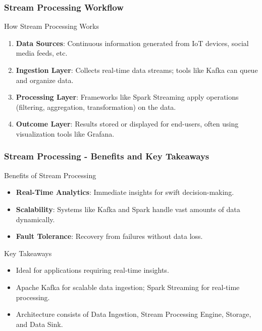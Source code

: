 \documentclass[aspectratio=169]{beamer}
\begin{document}
\begin{frame}[fragile]
    \frametitle{Stream Processing Workflow}
    \begin{block}{How Stream Processing Works}
        \begin{enumerate}
            \item \textbf{Data Sources}: Continuous information generated from IoT devices, social media feeds, etc.
            \item \textbf{Ingestion Layer}: Collects real-time data streams; tools like Kafka can queue and organize data.
            \item \textbf{Processing Layer}: Frameworks like Spark Streaming apply operations (filtering, aggregation, transformation) on the data.
            \item \textbf{Outcome Layer}: Results stored or displayed for end-users, often using visualization tools like Grafana.
        \end{enumerate}
    \end{block}
\end{frame}

\begin{frame}[fragile]
    \frametitle{Stream Processing - Benefits and Key Takeaways}
    \begin{block}{Benefits of Stream Processing}
        \begin{itemize}
            \item \textbf{Real-Time Analytics}: Immediate insights for swift decision-making.
            \item \textbf{Scalability}: Systems like Kafka and Spark handle vast amounts of data dynamically.
            \item \textbf{Fault Tolerance}: Recovery from failures without data loss.
        \end{itemize}
    \end{block}

    \begin{block}{Key Takeaways}
        \begin{itemize}
            \item Ideal for applications requiring real-time insights.
            \item Apache Kafka for scalable data ingestion; Spark Streaming for real-time processing.
            \item Architecture consists of Data Ingestion, Stream Processing Engine, Storage, and Data Sink.
        \end{itemize}
    \end{block}
\end{frame}
\end{document}

